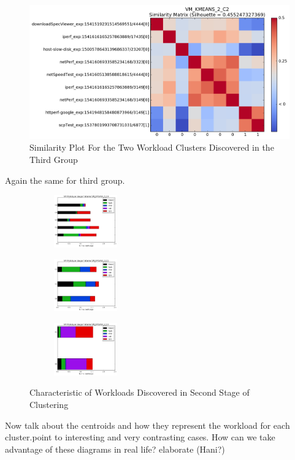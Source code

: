 \documentclass[10pt, conference, compsocconf]{IEEEtran}
\begin{document}
\begin{figure}[!htpb]
\centering
\includegraphics[width=\textwidth]{figs/VM_KMEANS_2_C2.png}
\caption{Similarity Plot For the Two Workload Clusters Discovered in the Third Group}
\label{fig:c2-sim}
\end{figure}
Again the same for third group.

\begin{figure}
	\begin{subfigure}
		\centering
		\includegraphics[width=0.3\textwidth]{figs/VM_KMEANS_5_C0_centroids.png}
		\label{fig:c0-centroids}
	\end{subfigure}%
	\begin{subfigure}
		\centering
		\includegraphics[width=0.3\textwidth]{figs/VM_KMEANS_3_C1_centroids.png}
		\label{fig:c1-centroids}
	\end{subfigure}%
	\begin{subfigure}
		\centering
		\includegraphics[width=0.3\textwidth]{figs/VM_KMEANS_2_C2_centroids.png}
		\label{fig:c2-centroids}
	\end{subfigure}%
	\caption{Characteristic of Workloads Discovered in Second Stage of Clustering}
	\label{fig:2nd-centroids}
\end{figure}
Now talk about the centroids and how they represent the workload for each cluster.point to interesting and very contrasting cases. How can we take advantage of these diagrams in real life? elaborate (Hani?)
\end{document}
